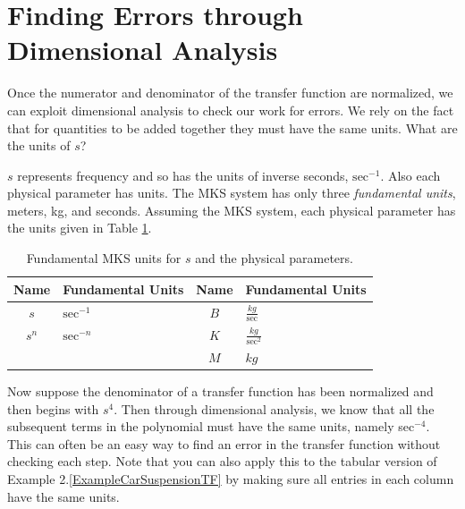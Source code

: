 \begin{ExampleCont}
\end{ExampleCont}



\section{Finding Errors through Dimensional Analysis}

Once the numerator and denominator of the transfer function are normalized, we can exploit dimensional analysis to check our work for errors.   We rely on the fact that for quantities to be added together they must have the same units.  What are the units of $s$?

$s$ represents frequency and so has the units of inverse seconds, $\mathrm{sec}^{-1}$.  Also each physical parameter has units.  The MKS system has only three {\it fundamental units}, meters, kg, and seconds. Assuming the MKS system, each physical parameter has the units given in Table \ref{unitstable}.

\begin{table}[h]\centering
\renewcommand{\arraystretch}{1.5} %
\begin{tabular}{c|l|c|l}
Name	& Fundamental Units & Name	& Fundamental Units \\ \hline
$s$	& $\mathrm{sec}^{-1}$      & $B$	& $\frac{kg}{\mathrm{sec}}$  \\
$s^n$   & $\mathrm{sec}^{-n}$  & $K$	& $\frac{kg}{\mathrm{sec}^2}$  \\
& & $M$	& $kg$ \\
\end{tabular}
\caption{Fundamental MKS units for $s$ and the physical parameters.}\label{unitstable}
\end{table}

Now suppose the denominator of a transfer function has been normalized and then begins with $s^4$.   Then through dimensional analysis, we know that all the subsequent terms in the polynomial must have the same units, namely sec$^{-4}$.  This can often be an easy way to find an error in the transfer function without checking each step. Note that you can also apply this to the tabular version of
Example 2.\ref{ExampleCarSuspensionTF}
by making sure all entries in each column have the same units.


